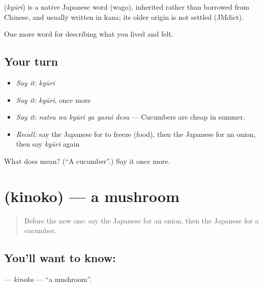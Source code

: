 \begin{cousinweb}
\textbf{} (\emph{kyūri}) is a native Japanese word (wago), inherited rather than borrowed from Chinese, and usually written in kana; its older origin is not settled (JMdict).
\end{cousinweb}

\begin{grammarlens}[title={What you've built}]
One more word for describing what you lived and felt.
\end{grammarlens}

\subsection*{Your turn}
\begin{itemize}
\raggedright
  \item \emph{Say it:} \emph{kyūri}
  \item \emph{Say it:} \emph{kyūri}, once more
  \item \emph{Say it:} \emph{natsu wa kyūri ga yasui desu} — Cucumbers are cheap in summer.
  \item \emph{Recall:} say the Japanese for to freeze (food), then the Japanese for an onion, then say \emph{kyūri} again
\end{itemize}

\begin{tcolorbox}[breakable,colback=teal!4,colframe=teal!35!black,title={Before you move on}]
What does  mean? (\textquotedblleft{}A cucumber\textquotedblright{}.) Say it once more.
\end{tcolorbox}
\section[\texorpdfstring{\ja{きのこ} (kinoko)}{きのこ (kinoko)}]{ (kinoko) — a mushroom}

\label{lesson:JA-C494-kinoko}



\begin{quote}
Before the new one: say the Japanese for an onion, then the Japanese for a cucumber.
\end{quote}

\subsection*{You'll want to know: }
\textbf{} — \emph{kinoko} — \textquotedblleft{}a mushroom\textquotedblright{}.

